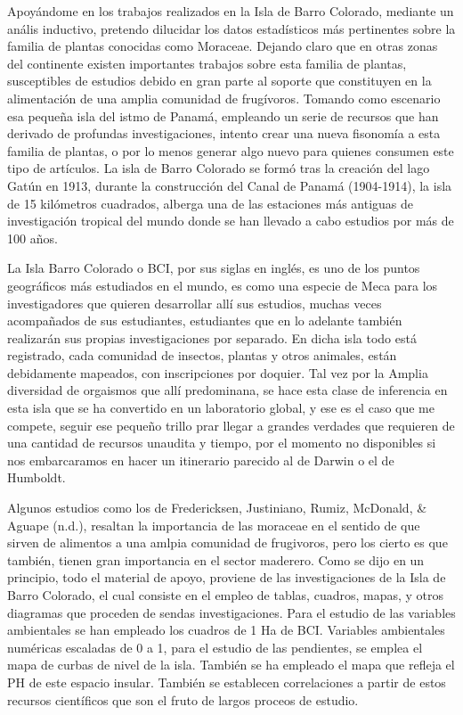 \documentclass[11pt,]{article}
\begin{document}
Apoyándome en los trabajos realizados en la Isla de Barro Colorado,
mediante un anális inductivo, pretendo dilucidar los datos estadísticos
más pertinentes sobre la familia de plantas conocidas como Moraceae.
Dejando claro que en otras zonas del continente existen importantes
trabajos sobre esta familia de plantas, susceptibles de estudios debido
en gran parte al soporte que constituyen en la alimentación de una
amplia comunidad de frugívoros. Tomando como escenario esa pequeña isla
del istmo de Panamá, empleando un serie de recursos que han derivado de
profundas investigaciones, intento crear una nueva fisonomía a esta
familia de plantas, o por lo menos generar algo nuevo para quienes
consumen este tipo de artículos. La isla de Barro Colorado se formó tras
la creación del lago Gatún en 1913, durante la construcción del Canal de
Panamá (1904-1914), la isla de 15 kilómetros cuadrados, alberga una de
las estaciones más antiguas de investigación tropical del mundo donde se
han llevado a cabo estudios por más de 100 años.

La Isla Barro Colorado o BCI, por sus siglas en inglés, es uno de los
puntos geográficos más estudiados en el mundo, es como una especie de
Meca para los investigadores que quieren desarrollar allí sus estudios,
muchas veces acompañados de sus estudiantes, estudiantes que en lo
adelante también realizarán sus propias investigaciones por separado. En
dicha isla todo está registrado, cada comunidad de insectos, plantas y
otros animales, están debidamente mapeados, con inscripciones por
doquier. Tal vez por la Amplia diversidad de orgaismos que allí
predominana, se hace esta clase de inferencia en esta isla que se ha
convertido en un laboratorio global, y ese es el caso que me compete,
seguir ese pequeño trillo prar llegar a grandes verdades que requieren
de una cantidad de recursos unaudita y tiempo, por el momento no
disponibles si nos embarcaramos en hacer un itinerario parecido al de
Darwin o el de Humboldt.

Algunos estudios como los de Fredericksen, Justiniano, Rumiz, McDonald,
\& Aguape (n.d.), resaltan la importancia de las moraceae en el sentido
de que sirven de alimentos a una amlpia comunidad de frugivoros, pero
los cierto es que también, tienen gran importancia en el sector
maderero. Como se dijo en un principio, todo el material de apoyo,
proviene de las investigaciones de la Isla de Barro Colorado, el cual
consiste en el empleo de tablas, cuadros, mapas, y otros diagramas que
proceden de sendas investigaciones. Para el estudio de las variables
ambientales se han empleado los cuadros de 1 Ha de BCI. Variables
ambientales numéricas escaladas de 0 a 1, para el estudio de las
pendientes, se emplea el mapa de curbas de nivel de la isla. También se
ha empleado el mapa que refleja el PH de este espacio insular. También
se establecen correlaciones a partir de estos recursos científicos que
son el fruto de largos proceos de estudio.
\end{document}
